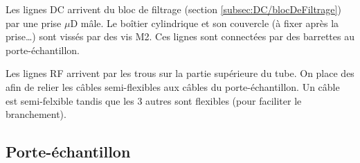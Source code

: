 \documentclass[a4paper,11pt]{article}
\newcommand{\uD}{$\mu$D }
\begin{document}
Les lignes DC arrivent du bloc de filtrage (section \ref{subsec:DC/blocDeFiltrage}) par une prise \uD mâle. Le boîtier cylindrique et son couvercle (à fixer après la prise…) sont vissés par des vis M2. Ces lignes sont connectées par des barrettes au porte-échantillon.\medskip

Les lignes RF arrivent par les trous sur la partie supérieure du tube. On place des 
afin de relier les câbles semi-flexibles aux câbles du porte-échantillon. Un câble est semi-felxible tandis que les 3 autres sont flexibles (pour faciliter le branchement).

\subsection{Porte-échantillon}
\end{document}
